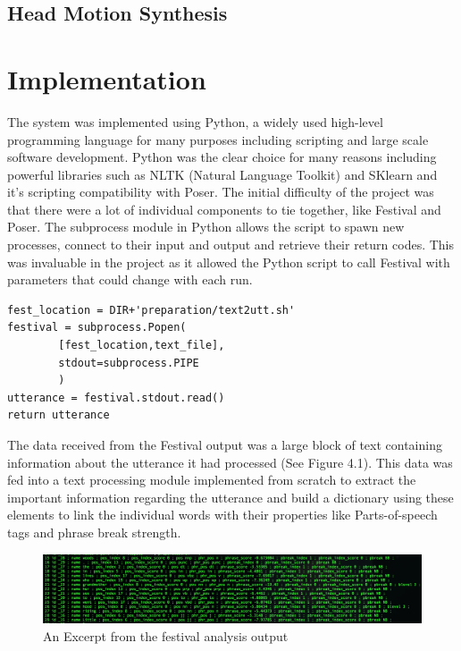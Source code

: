 \documentclass[bsc,frontabs,twoside,singlespacing,parskip]{infthesis}
\begin{document}
\section{Head Motion Synthesis}

\chapter{Implementation}

The system was implemented using Python, a widely used high-level programming language for many purposes including scripting and large scale software development. Python was the clear choice for many reasons including powerful libraries such as NLTK (Natural Language Toolkit) \cite{nltk} and SKlearn \cite{sklearn} and it's scripting compatibility with Poser. The initial difficulty of the project was that there were a lot of individual components to tie together, like Festival and Poser. The subprocess module in Python allows the script to spawn new processes, connect to their input and output and retrieve their return codes. This was invaluable in the project as it allowed the Python script to call Festival with parameters that could change with each run.

\begin{lstlisting}
fest_location = DIR+'preparation/text2utt.sh'
festival = subprocess.Popen(
		[fest_location,text_file], 
		stdout=subprocess.PIPE
		)
utterance = festival.stdout.read()
return utterance
\end{lstlisting}

The data received from the Festival output was a large block of text containing information about the utterance it had processed (See Figure 4.1). This data was fed into a text processing module implemented from scratch to extract the important information regarding the utterance and build a dictionary using these elements to link the individual words with their properties like Parts-of-speech tags and phrase break strength.

\begin{figure}
	\includegraphics[width=1.0\textwidth]{festival_output.png}
	\caption{An Excerpt from the festival analysis output}
\end{figure}
\end{document}
